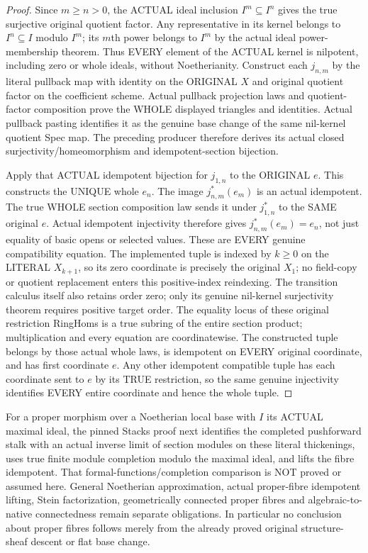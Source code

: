 \begin{proof}
Since $m\ge n>0$, the ACTUAL ideal inclusion $I^m\subseteq I^n$ gives the
true surjective original quotient factor. Any representative in its kernel
belongs to $I^n\subseteq I$ modulo $I^m$; its $m$th power belongs to
$I^m$ by the actual ideal power-membership theorem. Thus EVERY element of the ACTUAL kernel is
nilpotent, including zero or whole ideals, without Noetherianity.
Construct each $j_{n,m}$ by the literal pullback map with identity on the
ORIGINAL $X$ and original quotient factor on the coefficient scheme.
Actual pullback projection laws and quotient-factor composition prove the
WHOLE displayed triangles and identities. Actual pullback pasting
identifies it as the genuine base change of the same nil-kernel quotient
Spec map. The preceding producer therefore derives its actual closed
surjectivity/homeomorphism and idempotent-section bijection.

Apply that ACTUAL idempotent bijection for $j_{1,n}$ to the ORIGINAL $e$.
This constructs the UNIQUE whole $e_n$. The image $j_{n,m}^*(e_m)$ is
an actual idempotent. The true WHOLE section composition law sends it
under $j_{1,n}^*$ to the SAME original $e$. Actual idempotent injectivity
therefore gives $j_{n,m}^*(e_m)=e_n$, not just equality of basic opens or
selected values. These are EVERY genuine compatibility equation.
The implemented tuple is indexed by $k\ge0$ on the LITERAL $X_{k+1}$,
so its zero coordinate is precisely the original $X_1$; no field-copy or
quotient replacement enters this positive-index reindexing. The transition
calculus itself also retains order zero; only its genuine nil-kernel
surjectivity theorem requires positive target order.
The equality locus of these original restriction RingHoms is a true
subring of the entire section product; multiplication and every equation
are coordinatewise. The constructed tuple belongs by those actual whole
laws, is idempotent on EVERY original coordinate, and has first coordinate
$e$. Any other idempotent compatible tuple has each coordinate sent to
$e$ by its TRUE restriction, so the same genuine injectivity identifies
EVERY entire coordinate and hence the whole tuple.
\end{proof}

\begin{remark}
For a proper morphism over a Noetherian local base with $I$ its ACTUAL maximal ideal, the pinned Stacks proof
next identifies the completed pushforward stalk with an actual inverse
limit of section modules on these literal thickenings, uses true finite
module completion modulo the maximal ideal, and lifts the fibre
idempotent. That formal-functions/completion comparison is NOT proved or
assumed here. General Noetherian approximation, actual proper-fibre
idempotent lifting, Stein factorization, geometrically connected proper
fibres and algebraic-to-native connectedness remain separate obligations.
In particular no conclusion about proper fibres follows merely from the
already proved original structure-sheaf descent or flat base change.
\end{remark}
